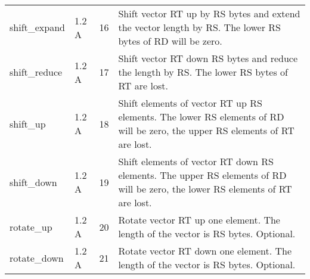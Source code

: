 \documentclass[forwardcom.tex]{subfiles}
\begin{document}
\begin{longtable} {|p{25mm}|p{14mm}|p{10mm}|p{95mm}|}
shift\_expand & 1.2 A & 16 & Shift vector RT up by RS bytes and extend the vector length by RS. The lower RS bytes of RD will be zero. \\
shift\_reduce & 1.2 A & 17 & Shift vector RT down RS bytes and reduce the length by RS. The lower RS bytes of RT are lost. \\
shift\_up     & 1.2 A & 18 & Shift elements of vector RT up RS elements. The lower RS elements of RD will be zero, the upper RS elements of RT are lost. \\
shift\_down   & 1.2 A & 19 & Shift elements of vector RT down RS elements. The upper RS
elements of RD will be zero, the lower RS elements of RT are lost. \\
rotate\_up  & 1.2 A & 20 & Rotate vector RT up one element. The length of the vector is RS bytes. Optional. \\
rotate\_down  & 1.2 A & 21 & Rotate vector RT down one element. The length of the vector is RS bytes. Optional. \\


\end{longtable}
\end{document}
